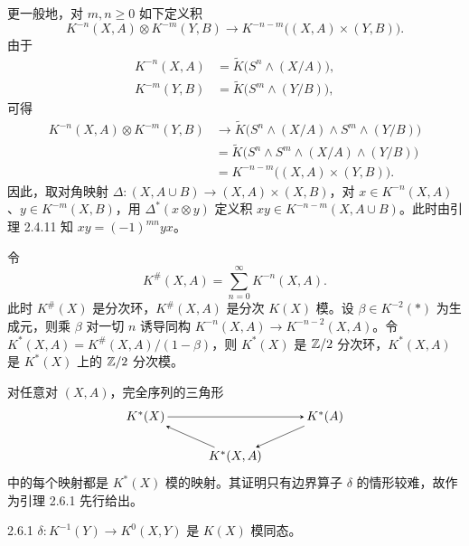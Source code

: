 更一般地，对 $m,n\ge 0$ 如下定义积
\[
K^{-n}(X,A)\otimes K^{-m}(Y,B)\longrightarrow K^{-n-m}\bigl((X,A)\times(Y,B)\bigr).
\]
由于
\begin{align*}
K^{-n}(X,A)&=\tilde K\bigl(S^n\wedge(X/A)\bigr),\\
K^{-m}(Y,B)&=\tilde K\bigl(S^m\wedge(Y/B)\bigr),
\end{align*}
可得
\begin{align*}
K^{-n}(X,A)\otimes K^{-m}(Y,B)&\longrightarrow\tilde K\bigl(S^n\wedge(X/A)\wedge S^m\wedge(Y/B)\bigr)\\
&=\tilde K\bigl(S^n\wedge S^m\wedge(X/A)\wedge(Y/B)\bigr)\\
&=K^{-n-m}\bigl((X,A)\times(Y,B)\bigr).
\end{align*}
因此，取对角映射 $\Delta\colon(X,A\cup B)\to(X,A)\times(X,B)$，对 $x\in K^{-n}(X,A)$、$y\in K^{-m}(X,B)$，用 $\Delta^*(x\otimes y)$ 定义积 $xy\in K^{-n-m}(X,A\cup B)$。此时由引理 2.4.11 知 $xy=(-1)^{mn}yx$。

令
\[
K^{\#}(X,A)=\sum_{n=0}^{\infty}K^{-n}(X,A).
\]
此时 $K^{\#}(X)$ 是分次环，$K^{\#}(X,A)$ 是分次 $K(X)$ 模。设 $\beta\in K^{-2}(*)$ 为生成元，则乘 $\beta$ 对一切 $n$ 诱导同构 $K^{-n}(X,A)\to K^{-n-2}(X,A)$。令 $K^*(X,A)=K^{\#}(X,A)/(1-\beta)$，则 $K^*(X)$ 是 $\mathbb{Z}/2$ 分次环，$K^*(X,A)$ 是 $K^*(X)$ 上的 $\mathbb{Z}/2$ 分次模。

对任意对 $(X,A)$，完全序列的三角形
\[
\begin{tikzpicture}[baseline=(current bounding box.center),>=stealth,
  every node/.style={inner sep=2pt}]
\node (X)  at (0,1.1)  {$K^*(X)$};
\node (A)  at (5,1.1)  {$K^*(A)$};
\node (XA) at (2.5,0)  {$K^*(X,A)$};
\draw[->] (X)  -- (A);
\draw[->] (XA) -- (X);
\draw[->] (A)  -- (XA);
\end{tikzpicture}
\]
中的每个映射都是 $K^*(X)$ 模的映射。其证明只有边界算子 $\delta$ 的情形较难，故作为引理 2.6.1 先行给出。

\begin{lemma*}{2.6.1}
  $\delta\colon K^{-1}(Y)\to K^0(X,Y)$ 是 $K(X)$ 模同态。
\end{lemma*}

